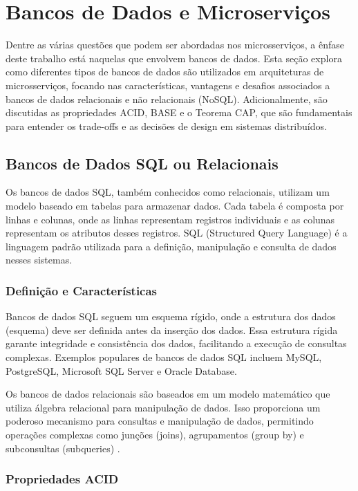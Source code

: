 \section{Bancos de Dados e Microserviços}

Dentre as várias questões que podem ser abordadas nos microsserviços, a ênfase deste trabalho está naquelas que envolvem bancos de dados. Esta seção explora como diferentes tipos de bancos de dados são utilizados em arquiteturas de microsserviços, focando nas características, vantagens e desafios associados a bancos de dados relacionais e não relacionais (NoSQL). Adicionalmente, são discutidas as propriedades ACID, BASE e o Teorema CAP, que são fundamentais para entender os trade-offs e as decisões de design em sistemas distribuídos.

\subsection{Bancos de Dados SQL ou Relacionais}

Os bancos de dados SQL, também conhecidos como relacionais, utilizam um modelo baseado em tabelas para armazenar dados. Cada tabela é composta por linhas e colunas, onde as linhas representam registros individuais e as colunas representam os atributos desses registros. SQL (Structured Query Language) é a linguagem padrão utilizada para a definição, manipulação e consulta de dados nesses sistemas.

\subsubsection{Definição e Características}

Bancos de dados SQL seguem um esquema rígido, onde a estrutura dos dados (esquema) deve ser definida antes da inserção dos dados. Essa estrutura rígida garante integridade e consistência dos dados, facilitando a execução de consultas complexas. Exemplos populares de bancos de dados SQL incluem MySQL, PostgreSQL, Microsoft SQL Server e Oracle Database.


Os bancos de dados relacionais são baseados em um modelo matemático que utiliza álgebra relacional para manipulação de dados. Isso proporciona um poderoso mecanismo para consultas e manipulação de dados, permitindo operações complexas como junções (joins), agrupamentos (group by) e subconsultas (subqueries) \cite{codd1970}.

\subsubsection{Propriedades ACID}

